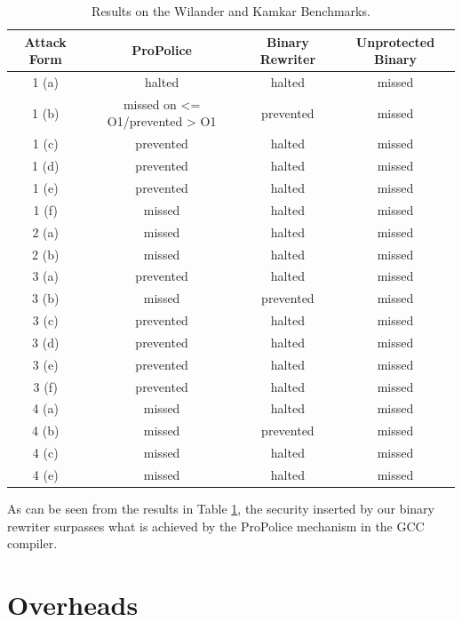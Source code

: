 \begin{table}
\begin{centering}
\begin{tabular}{ |c|c|c|c| }
\hline
\textbf{Attack Form} & \textbf{ProPolice} & \textbf{Binary Rewriter} & \textbf{Unprotected Binary}
\\
\hline
\hline
1 (a) & halted & halted & missed \\
\hline
1 (b) & missed on <= O1/prevented > O1 & prevented & missed \\
\hline
1 (c) & prevented & halted & missed \\
\hline
1 (d) & prevented & halted & missed \\
\hline
1 (e) & prevented & halted & missed \\
\hline
1 (f) & missed & halted & missed \\
\hline
2 (a) & missed & halted & missed \\
\hline
2 (b) & missed & halted & missed \\
\hline
3 (a) & prevented & halted & missed \\
\hline
3 (b) & missed & prevented & missed \\
\hline
3 (c) & prevented & halted & missed \\
\hline
3 (d) & prevented & halted & missed \\
\hline
3 (e) & prevented & halted & missed \\
\hline 
3 (f) & prevented & halted & missed \\
\hline
4 (a) & missed & halted & missed \\
\hline
4 (b) & missed & prevented & missed \\
\hline
4 (c) & missed & halted & missed \\
\hline
4 (e) & missed & halted & missed \\
\hline
\end{tabular}

\par\end{centering}

\caption{Results on the Wilander and Kamkar Benchmarks.}
\label{secresults}

\end{table}

As can be seen from the results in Table \ref{secresults}, the security inserted by our binary
rewriter surpasses what is achieved by the ProPolice mechanism in the GCC compiler.

\section{Overheads}


